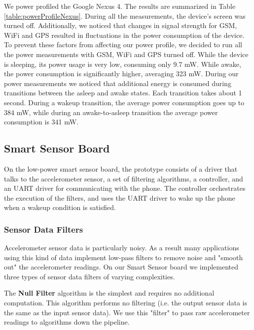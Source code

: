 We power profiled the Google Nexus 4. The results are summarized in Table \ref{table:powerProfileNexus}. During all the measurements, the device's screen was turned off. Additionally, we noticed that changes in signal strength for GSM, WiFi and GPS resulted in fluctuations in the power consumption of the device. To prevent these factors from affecting our power profile, we decided to run all the power measurements with GSM, WiFi and GPS turned off. While the device is sleeping, its power usage is very low, consuming only 9.7 mW. While awake, the power consumption is significantly higher, averaging 323 mW. During our power measurements we noticed that additional energy is consumed during transitions between the asleep and awake states. Each transition takes about 1 second. During a wakeup transition, the average power consumption goes up to 384 mW, while during an awake-to-asleep transition the average power consumption is 341 mW.


\subsection{Smart Sensor Board}
\label{subsec:sensorBoard}

On the low-power smart sensor board, the prototype consists of a driver that talks to the accelerometer sensor, a set of filtering algorithms, a controller, and an UART driver for communicating with the phone. The controller orchestrates the execution of the filters, and uses the UART driver to wake up the phone when a wakeup condition is satisfied.

\subsubsection{Sensor Data Filters}
\label{sec:sensorDataFilters}

Accelerometer sensor data is particularly noisy. As a result many applications using this kind of data implement low-pass filters to remove noise and "smooth out" the accelerometer readings. On our Smart Sensor board we implemented three types of sensor data filters of varying complexities. 

The \textbf{Null Filter} algorithm is the simplest and requires no additional computation. This algorithm performs no filtering (i.e. the output sensor data is the same as the input sensor data). We use this "filter" to pass raw accelerometer readings to algorithms down the pipeline.

